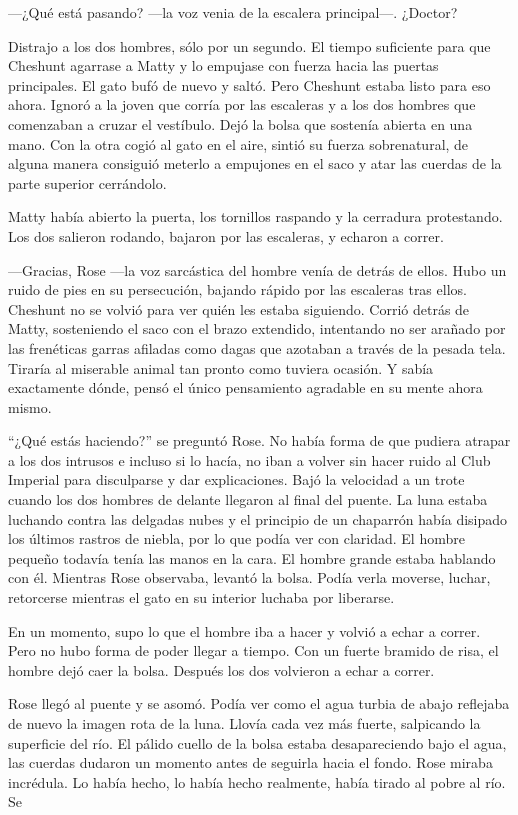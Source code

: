{---¿Qué está pasando? ---la voz venia de la escalera principal---.
¿Doctor?}

{Distrajo a los dos hombres, sólo por un segundo. El tiempo suficiente
	para que Cheshunt agarrase a Matty y lo empujase con fuerza hacia las
	puertas principales. El gato bufó de nuevo y saltó. Pero Cheshunt estaba
	listo para eso ahora. Ignoró a la joven que corría por las escaleras y a
	los dos hombres que comenzaban a cruzar el vestíbulo. Dejó la bolsa que
	sostenía abierta en una mano. Con la otra cogió al gato en el aire,
	sintió su fuerza sobrenatural, de alguna manera consiguió meterlo a
	empujones en el saco y atar las cuerdas de la parte superior
cerrándolo.}

{Matty había abierto la puerta, los tornillos raspando y la cerradura
	protestando. Los dos salieron rodando, bajaron por las escaleras, y
echaron a correr.}

{---Gracias, Rose ---la voz sarcástica del hombre venía de detrás de
	ellos. Hubo un ruido de pies en su persecución, bajando rápido por las
	escaleras tras ellos. Cheshunt no se volvió para ver quién les estaba
	siguiendo. Corrió detrás de Matty, sosteniendo el saco con el brazo
	extendido, intentando no ser arañado por las frenéticas garras afiladas
	como dagas que azotaban a través de la pesada tela. Tiraría al miserable
	animal tan pronto como tuviera ocasión. Y sabía exactamente dónde, pensó
el único pensamiento agradable en su mente ahora mismo.}

{``¿Qué estás haciendo?'' se preguntó Rose. No había forma de que
	pudiera atrapar a los dos intrusos e incluso si lo hacía, no iban a
	volver sin hacer ruido al Club Imperial para disculparse y dar
	explicaciones. Bajó la velocidad a un trote cuando los dos hombres de
	delante llegaron al final del puente. La luna estaba luchando contra las
	delgadas nubes y el principio de un chaparrón había disipado los últimos
	rastros de niebla, por lo que podía ver con claridad. El hombre pequeño
	todavía tenía las manos en la cara. El hombre grande estaba hablando con
	él. Mientras Rose observaba, levantó la bolsa. Podía verla moverse,
	luchar, retorcerse mientras el gato en su interior luchaba por
liberarse.}

{En un momento, supo lo que el hombre iba a hacer y volvió a echar a
	correr. Pero no hubo forma de poder llegar a tiempo. Con un fuerte
	bramido de risa, el hombre dejó caer la bolsa. Después los dos volvieron
a echar a correr.}

{Rose llegó al puente y se asomó. Podía ver como el agua turbia de abajo
	reflejaba de nuevo la imagen rota de la luna. Llovía cada vez más
	fuerte, salpicando la superficie del río. El pálido cuello de la bolsa
	estaba desapareciendo bajo el agua, las cuerdas dudaron un momento antes
	de seguirla hacia el fondo. Rose miraba incrédula. Lo había hecho, lo
había hecho realmente, había tirado al pobre al río. Se}

